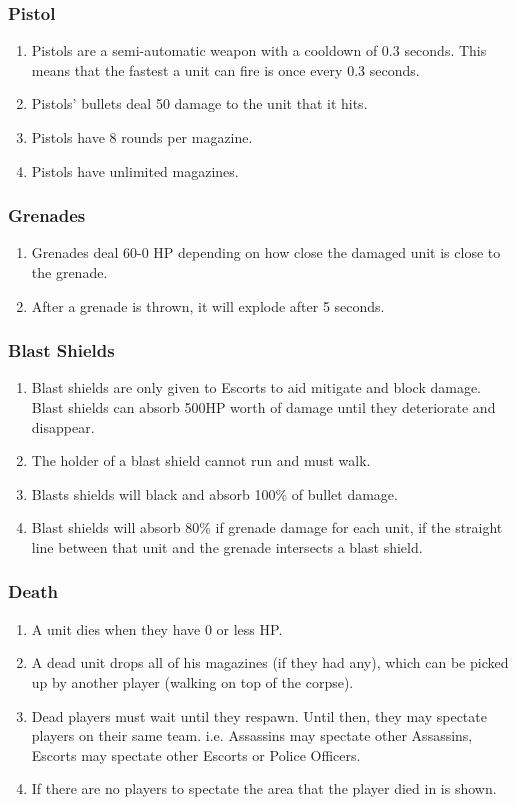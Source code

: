 \documentclass[12pt]{article}
\newenvironment{req} {\begin{enumerate}[leftmargin=2.5cm, label = \textbf{REQ \arabic{subsection}.\arabic{subsubsection}.\arabic*:}]} {\end{enumerate}}
\begin{document}
\subsubsection{Pistol}
\begin{req}
	\item Pistols are a semi-automatic weapon with a cooldown of 0.3 seconds. This means that the fastest a unit can fire is once every 0.3 seconds.
	\item Pistols' bullets deal 50 damage to the unit that it hits.
	\item Pistols have 8 rounds per magazine.
	\item Pistols have unlimited magazines. 
\end{req}

\subsubsection{Grenades}
\begin{req}
	\item Grenades deal 60-0 HP depending on how close the damaged unit is close to the grenade. 
	\item After a grenade is thrown, it will explode after 5 seconds.
\end{req}

\subsubsection{Blast Shields}
\begin{req}
	\item Blast shields are only given to Escorts to aid mitigate and block damage. Blast shields can absorb 500HP worth of damage until they deteriorate and disappear.
	\item The holder of a blast shield cannot run and must walk.
	\item Blasts shields will black and absorb 100\% of bullet damage.
	\item Blast shields will absorb 80\% if grenade damage for each unit, if the straight line between that unit and the grenade intersects a blast shield.
\end{req}

\subsubsection{Death}
\begin{req}
	\item A unit dies when they have 0 or less HP. 
	\item A dead unit drops all of his magazines (if they had any), which can be picked up by another player (walking on top of the corpse).
	\item Dead players must wait until they respawn. Until then, they may spectate players on their same team. i.e. Assassins may spectate other Assassins, Escorts may spectate other Escorts or Police Officers.
	\item If there are no players to spectate the area that the player died in is shown.
\end{req}
\end{document}
